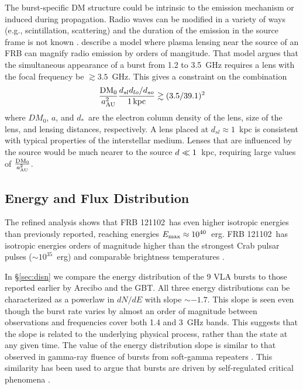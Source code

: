 \documentclass[twocolumn]{aastex61}
\newcommand{\frb}{FRB 121102}
\begin{document}
The burst-specific DM structure could be intrinsic to the emission mechanism or induced during propagation. Radio waves can be modified in a variety of ways (e.g., scintillation, scattering) and the duration of the emission in the source frame is not known \citep{2016arXiv160505890C}. \citet{CORDES} describe a model where plasma lensing near the source of an FRB can magnify radio emission by orders of mangitude. That model argues that the simultaneous appearance of a burst from 1.2 to 3.5~GHz requires a lens with the focal frequency be $\gtrsim 3.5$~GHz. This gives a constraint on the combination 
$$\frac{\rm DM_0}{a_{\rm AU}^2} \frac{d_{sl}d_{lo}/d_{so}}{1\, \rm kpc} \gtrsim (3.5 / 39.1)^2$$
where $DM_0$, $a$, and $d_*$\ are the electron column density of the lens, size of the lens, and lensing distances, respectively. A lens placed at $d_{sl}\approx1$~kpc is consistent with typical properties of the interstellar medium. Lenses that are influenced by the source would be much nearer to the source $d_{\sl} \ll 1$~kpc, requiring large values of $\frac{\rm DM_0}{a_{\rm AU}^2}$.

\subsection{Energy and Flux Distribution}

The refined analysis shows that \frb\ has even higher isotropic energies than previously reported, reaching energies $E_{\rm{max}}\approx10^{40}$\ erg. \frb\ has isotropic energies orders of magnitude higher than the strongest Crab pulsar pulses ($\sim10^{35}$~erg) and comparable brightness temperatures \citep[$T_b^{\rm{Crab}}\sim10^{41}$~K versus $T_b^{\rm{FRB 121102}}\sim10^{38}$~K;][]{2003Natur.422..141H,2014PhRvD..89j3009K}. 

In \S \ref{sec:disn} we compare the energy distribution of the 9 VLA bursts to those reported earlier by Arecibo and the GBT. All three energy distributions can be characterized as a powerlaw in $dN/dE$ with slope $\sim-1.7$. This slope is seen even though the burst rate varies by almost an order of magnitude between observations and frequencies cover both 1.4 and 3~GHz bands. This suggests that the slope is related to the underlying physical process, rather than the state at any given time. The value of the energy distribution slope is similar to that observed in gamma-ray fluence of bursts from soft-gamma repeaters \citep{2000ApJ...532L.121G, 2011ApJ...739...94S}. This similarity has been used to argue that bursts are driven by self-regulated critical phenomena \citep[slope$=-5/3$;][]{2011SoPh..274...99A}.
\end{document}
